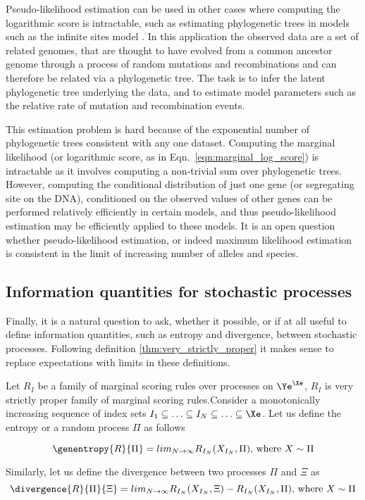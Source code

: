 Pseudo-likelihood estimation can be used in other cases where computing the logarithmic score is intractable, such as estimating phylogenetic trees in models such as the infinite sites model \citep{something, something} . In this application the observed data are a set of related genomes, that are thought to have evolved from a common ancestor genome through a process of random mutations and recombinations and can therefore be related via a phylogenetic tree. The task is to infer the latent phylogenetic tree underlying the data, and to estimate model parameters such as the relative rate of mutation and recombination events.

This estimation problem is hard because of the exponential number of phylogenetic trees consistent with any one dataset. Computing the marginal likelihood (or logarithmic score, as in Eqn.\ \eqref{eqn:marginal_log_score}) is intractable as it involves computing a non-trivial sum over phylogenetic trees. However, computing the conditional distribution of just one gene (or segregating site on the DNA), conditioned on the observed values of other genes can be performed relatively efficiently in certain models, and thus pseudo-likelihood estimation may be efficiently applied to these models. It is an open question whether pseudo-likelihood estimation, or indeed maximum likelihood estimation is consistent in the limit of increasing number of alleles and species.

\subsection{Information quantities for stochastic processes}

Finally, it is a natural question to ask, whether it possible, or if at all useful to define information quantities, such as entropy and divergence, between stochastic processes. Following definition \ref{thm:very_strictly_proper} it makes sense to replace expectations with limits in these definitions.

\begin{definition}\label{thm:process_entropy_divergence}
Let $R_{I}$ be a family of marginal scoring rules over processes on $\Ye^{\Xe}$, $R_{I}$ is very strictly proper family of marginal scoring rules.Consider a monotonically increasing sequence of index sets $I_1\subseteq\ldots\subseteq I_N \subseteq \ldots \subseteq \Xe$. Let us define the entropy or a random process $\Pi$ as follows

\begin{equation}
	\genentropy{R}{\Pi} = lim_{N\rightarrow\infty}R_{I_N}(X_{I_N},\Pi) \mbox{, where } X \sim \Pi
\end{equation}

Similarly, let us define the divergence between two processes $\Pi$ and $\Xi$ as
\begin{equation}
	\divergence{R}{\Pi}{\Xi} =  lim_{N\rightarrow\infty}R_{I_N}(X_{I_N},\Xi) - R_{I_N}(X_{I_N},\Pi) \mbox{, where } X \sim \Pi
\end{equation}
\end{definition}

